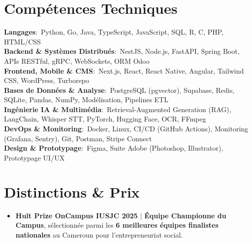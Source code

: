 \documentclass[letterpaper,10pt]{article}
\newcommand{\resumeItem}[1]{
  \item\small{
    {#1 \vspace{-1.5pt}}
  }
}
\begin{document}
\section{Compétences Techniques}
\begin{itemize}[leftmargin=0.15in, label={}]
    \small{\item{
     \textbf{Langages}{:\ Python, Go, Java, TypeScript, JavaScript, SQL, R, C, PHP, HTML/CSS} \\ \vspace{1.5pt}
     \textbf{Backend \& Systèmes Distribués}{:\ NestJS, Node.js, FastAPI, Spring Boot, APIs RESTful, gRPC, WebSockets, ORM Odoo} \\ \vspace{1.5pt}
     \textbf{Frontend, Mobile \& CMS}{:\ Next.js, React, React Native, Angular, Tailwind CSS, WordPress, Turborepo} \\ \vspace{1.5pt}
     \textbf{Bases de Données \& Analyse}{:\ PostgreSQL (pgvector), Supabase, Redis, SQLite, Pandas, NumPy, Modélisation, Pipelines ETL} \\ \vspace{1.5pt}
     \textbf{Ingénierie IA \& Multimédia}{:\ Retrieval-Augmented Generation (RAG), LangChain, Whisper STT, PyTorch, Hugging Face, OCR, FFmpeg} \\ \vspace{1.5pt}
     \textbf{DevOps \& Monitoring}{:\ Docker, Linux, CI/CD (GitHub Actions), Monitoring (Grafana, Sentry), Git, Postman, Stripe Connect} \\ \vspace{1.5pt}
     \textbf{Design \& Prototypage}{:\ Figma, Suite Adobe (Photoshop, Illustrator), Prototypage UI/UX}
    }}
\end{itemize}

\section{Distinctions \& Prix}
\begin{itemize}[leftmargin=0.15in, label={$\vcenter{\hbox{\tiny$\bullet$}}$}, itemsep=1pt]
    \resumeItem{\textbf{Hult Prize OnCampus IUSJC 2025} $|$ \textbf{Équipe Championne du Campus}, sélectionnée parmi les \textbf{6 meilleures équipes finalistes nationales} au Cameroun pour l'entrepreneuriat social.}
\end{itemize}

\end{document}
